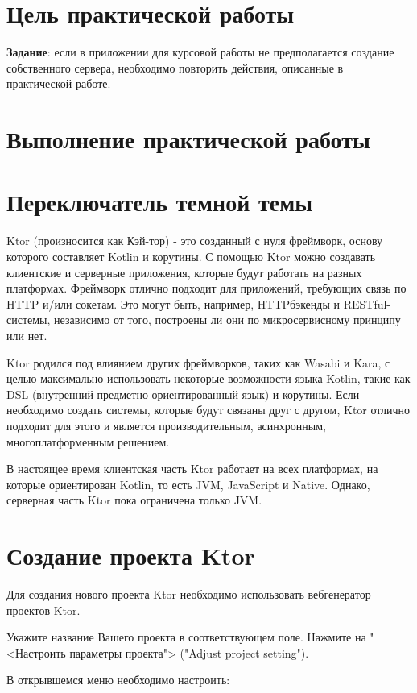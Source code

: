 \section*{\LARGE Цель практической работы}

\textbf{Задание}:
если в приложении для курсовой работы не предполагается
создание собственного сервера, необходимо повторить действия,
описанные в практической работе.

\clearpage

\section*{\LARGE Выполнение практической работы}

\section{Переключатель темной темы}

Ktor (произносится как Кэй-тор) - это созданный с нуля фреймворк,
основу которого составляет Kotlin и корутины. С помощью Ktor можно
создавать клиентские и серверные приложения, которые будут работать на
разных платформах. Фреймворк отлично подходит для приложений,
требующих связь по HTTP и/или сокетам. Это могут быть, например, HTTPбэкенды и RESTful-системы, независимо от того, построены ли они по
микросервисному принципу или нет.\par
Ktor родился под влиянием других фреймворков, таких как Wasabi и
Kara, с целью максимально использовать некоторые возможности языка Kotlin,
такие как DSL (внутренний предметно-ориентированный язык) и корутины.
Если необходимо создать системы, которые будут связаны друг с другом, Ktor
отлично подходит для этого и является производительным, асинхронным,
многоплатформенным решением.\par
В настоящее время клиентская часть Ktor работает на всех платформах,
на которые ориентирован Kotlin, то есть JVM, JavaScript и Native. Однако,
серверная часть Ktor пока ограничена только JVM.\par

\section{Создание проекта Ktor}

Для создания нового проекта Ktor необходимо использовать
вебгенератор проектов Ktor.\par
Укажите название Вашего проекта в соответствующем поле.
Нажмите на "<Настроить параметры проекта">
("Adjust project setting").\par
В открывшемся меню необходимо настроить:


